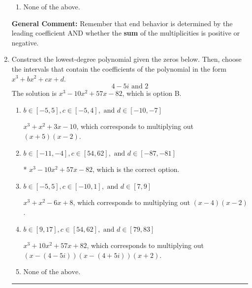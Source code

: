 \documentclass{extbook}[14pt]
\newcommand{\litem}[1]{\item #1

\rule{\textwidth}{0.4pt}}
\begin{document}
\begin{enumerate}
{\begin{enumerate}[label=\Alph*.]
\item None of the above.\end{enumerate}
\textbf{General Comment:} Remember that end behavior is determined by the leading coefficient AND whether the \textbf{sum} of the multiplicities is positive or negative.
}
\litem{
Construct the lowest-degree polynomial given the zeros below. Then, choose the intervals that contain the coefficients of the polynomial in the form $x^3+bx^2+cx+d$.
\[ 4 - 5 i \text{ and } 2 \]The solution is \( x^{3} -10 x^{2} +57 x -82 \), which is option B.\begin{enumerate}[label=\Alph*.]
\item \( b \in [-5, 5], c \in [-5, 4], \text{ and } d \in [-10, -7] \)

$x^{3} + x^{2} +3 x -10$, which corresponds to multiplying out $(x + 5)(x -2)$.
\item \( b \in [-11, -4], c \in [54, 62], \text{ and } d \in [-87, -81] \)

* $x^{3} -10 x^{2} +57 x -82$, which is the correct option.
\item \( b \in [-5, 5], c \in [-10, 1], \text{ and } d \in [7, 9] \)

$x^{3} + x^{2} -6 x + 8$, which corresponds to multiplying out $(x -4)(x -2)$.
\item \( b \in [9, 17], c \in [54, 62], \text{ and } d \in [79, 83] \)

$x^{3} +10 x^{2} +57 x + 82$, which corresponds to multiplying out $(x-(4 - 5 i))(x-(4 + 5 i))(x + 2)$.
\item \( \text{None of the above.} \)


\end{enumerate}}
\end{enumerate}
\end{document}
